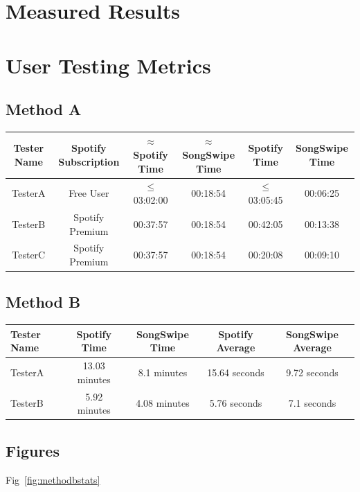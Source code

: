 \documentclass{article}
\begin{document}
\section{Measured Results}
\section*{User Testing Metrics}
\subsection*{Method A}
\hspace{-0.5in}
\begin{tabular}{cccccc}
  \hline
  \small\textbf{Tester Name} & \small\textbf{Spotify Subscription} & \small\textbf{$\approx$ Spotify Time} & \small\textbf{$\approx$ SongSwipe Time} & \small\textbf{Spotify Time} & \small\textbf{SongSwipe Time} \\
  \hline
  TesterA & Free User & $\leq$ 03:02:00 & 00:18:54 & $\leq$ 03:05:45 & 00:06:25 \\
  TesterB & Spotify Premium & 00:37:57 & 00:18:54 & 00:42:05 & 00:13:38 \\
  TesterC & Spotify Premium & 00:37:57 & 00:18:54 & 00:20:08 & 00:09:10 \\
  \hline
\end{tabular}

\subsection*{Method B}
\begin{tabularx}{\textwidth}{X c c c c}
\toprule
\textbf{Tester Name} & \textbf{Spotify Time} & \textbf{SongSwipe Time} & \textbf{Spotify Average} & \textbf{SongSwipe Average} \\
\midrule
TesterA & 13.03 minutes & 8.1 minutes & 15.64 seconds & 9.72 seconds \\
TesterB & 5.92 minutes & 4.08 minutes & 5.76 seconds & 7.1 seconds \\
\bottomrule
\end{tabularx}

\subsection*{Figures}

Fig~\ref{fig:methodbstats}
\end{document}
